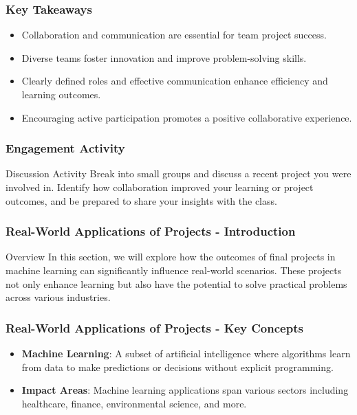 \documentclass[aspectratio=169]{beamer}
\begin{document}
\begin{frame}[fragile]
    \frametitle{Key Takeaways}
    \begin{itemize}
        \item Collaboration and communication are essential for team project success.
        \item Diverse teams foster innovation and improve problem-solving skills.
        \item Clearly defined roles and effective communication enhance efficiency and learning outcomes.
        \item Encouraging active participation promotes a positive collaborative experience.
    \end{itemize}
\end{frame}

\begin{frame}[fragile]
    \frametitle{Engagement Activity}
    \begin{block}{Discussion Activity}
        Break into small groups and discuss a recent project you were involved in. Identify how collaboration improved your learning or project outcomes, and be prepared to share your insights with the class.
    \end{block}
\end{frame}

\begin{frame}[fragile]
    \frametitle{Real-World Applications of Projects - Introduction}
    \begin{block}{Overview}
        In this section, we will explore how the outcomes of final projects in machine learning can significantly influence real-world scenarios. 
        These projects not only enhance learning but also have the potential to solve practical problems across various industries.
    \end{block}
\end{frame}

\begin{frame}[fragile]
    \frametitle{Real-World Applications of Projects - Key Concepts}
    \begin{itemize}
        \item \textbf{Machine Learning}: A subset of artificial intelligence where algorithms learn from data to make predictions or decisions without explicit programming.
        \item \textbf{Impact Areas}: Machine learning applications span various sectors including healthcare, finance, environmental science, and more.
    \end{itemize}
\end{frame}
\end{document}
